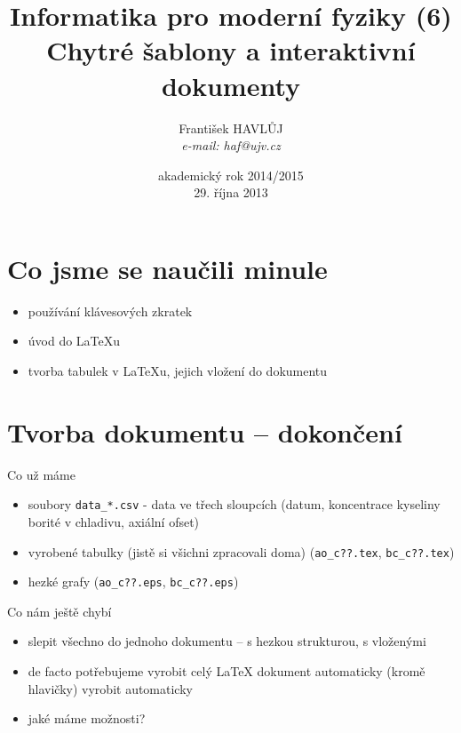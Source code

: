 \documentclass{beamer}
\title[IMF (6)]{Informatika pro moderní fyziky (6)\\ Chytré šablony a interaktivní dokumenty}
\author[Franti\v{s}ek HAVL\r{U}J, ORF ÚJV Řež]{Franti\v{s}ek HAVL\r{U}J\\{\scriptsize \emph{e-mail: haf@ujv.cz}}}
\date{akademický rok 2014/2015\\29. října 2013}
\institute[ORF ÚJV Řež]
{ÚJV Řež\\oddělení Reaktorové fyziky a podpory palivového cyklu}
\begin{document}
\begin{frame}
  \titlepage
\end{frame}

\begin{frame}
  \tableofcontents
\end{frame}

\section{Co jsme se naučili minule}

\begin{frame}{}
  \begin{itemize}
    \item používání klávesových zkratek
    \item úvod do LaTeXu
    \item tvorba tabulek v LaTeXu, jejich vložení do dokumentu
  \end{itemize}
\end{frame}

\section{Tvorba dokumentu -- dokončení}

\begin{frame}{Co už máme}
  \begin{itemize}
    \item soubory \texttt{data\_*.csv} - data ve třech sloupcích (datum, koncentrace kyseliny borité v chladivu, axiální ofset)
    \item vyrobené tabulky (jistě si všichni zpracovali doma) (\texttt{ao\_c??.tex}, \texttt{bc\_c??.tex})
    \item hezké grafy (\texttt{ao\_c??.eps}, \texttt{bc\_c??.eps})
  \end{itemize}
\end{frame}

\begin{frame}{Co nám ještě chybí}
  \begin{itemize}
    \item slepit všechno do jednoho dokumentu -- s hezkou strukturou, s vloženými
    \item de facto potřebujeme vyrobit celý LaTeX dokument automaticky (kromě hlavičky) vyrobit automaticky
    \item jaké máme možnosti?
  \end{itemize}
\end{frame}
\end{document}
